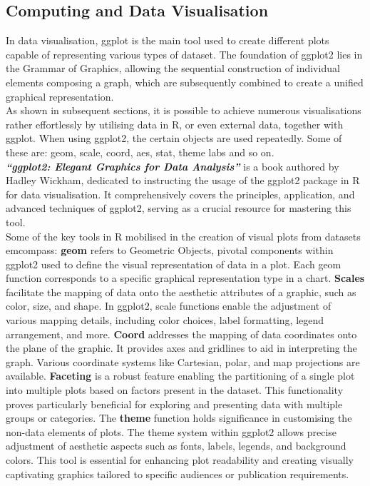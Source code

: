 \documentclass{article}\usepackage[]{graphicx}\usepackage[]{xcolor}
\begin{document}
\subsection{Computing and Data Visualisation}

In data visualisation, ggplot is the main tool used to create different plots capable of representing various types of dataset. The foundation of ggplot2 lies in the Grammar of Graphics, allowing the sequential construction of individual elements composing a graph, which are subsequently combined to create a unified graphical representation.\\

\noindent
As shown in subsequent sections, it is possible to achieve numerous visualisations rather effortlessly by utilising data in R, or even external data, together with ggplot.
When using ggplot2, the certain objects are used repeatedly. Some of these are: geom, scale, coord, aes, stat, theme labs and so on.\\

\noindent \textbf{\textit{``ggplot2: Elegant Graphics for Data Analysis''}}\cite{ggplot2} is a book authored by Hadley Wickham, dedicated to instructing the usage of the ggplot2 package in R for data visualisation. It comprehensively covers the principles, application, and advanced techniques of ggplot2, serving as a crucial resource for mastering this tool.\\

\noindent 
Some of the key tools in R mobilised in the creation of visual plots from datasets emcompass:
\noindent
\textbf{geom} refers to Geometric Objects, pivotal components within ggplot2 used to define the visual representation of data in a plot. Each geom function corresponds to a specific graphical representation type in a chart. \textbf{Scales} facilitate the mapping of data onto the aesthetic attributes of a graphic, such as color, size, and shape. In ggplot2, scale functions enable the adjustment of various mapping details, including color choices, label formatting, legend arrangement, and more. \textbf{Coord} addresses the mapping of data coordinates onto the plane of the graphic. It provides axes and gridlines to aid in interpreting the graph. Various coordinate systems like Cartesian, polar, and map projections are available. \textbf{Faceting} is a robust feature enabling the partitioning of a single plot into multiple plots based on factors present in the dataset. This functionality proves particularly beneficial for exploring and presenting data with multiple groups or categories. The \textbf{theme} function holds significance in customising the non-data elements of plots. The theme system within ggplot2 allows precise adjustment of aesthetic aspects such as fonts, labels, legends, and background colors. This tool is essential for enhancing plot readability and creating visually captivating graphics tailored to specific audiences or publication requirements.\\
\end{document}
